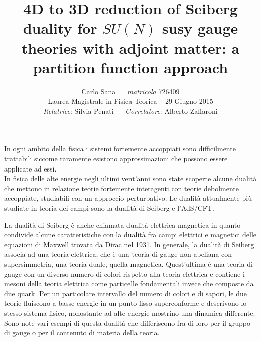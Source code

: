 \documentclass[a4paper,12pt]{article}
\author{
 Carlo Sana  ~~ \emph{matricola} 726409 \\
 Laurea Magistrale in Fisica Teorica -- 29 Giugno 2015\\
\emph{Relatrice}: Silvia Penati 
~~
\emph{Correlatore}: Alberto Zaffaroni\\
}
\date{}
\title{ \textbf{4D to 3D reduction of Seiberg duality for $SU(N)$ susy gauge theories with adjoint matter: a partition function approach }}
\begin{document}
\maketitle
In ogni ambito della fisica i sistemi fortemente accoppiati sono difficilmente trattabili siccome raramente esistono approssimazioni che possono essere applicate ad essi.\\
In fisica delle alte energie negli ultimi vent'anni sono state scoperte alcune dualità che mettono in relazione teorie fortemente interagenti con teorie debolmente accoppiate, studiabili con un approccio perturbativo.
Le dualità attualmente più studiate in teoria dei campi sono la dualità di Seiberg e l'AdS/CFT.

La dualità di Seiberg è anche chiamata dualità elettrica-magnetica in quanto condivide alcune caratteristiche con la dualità fra campi elettrici e magnetici delle equazioni di Maxwell trovata da Dirac nel 1931. 
In generale, la dualità di Seiberg associa ad una teoria elettrica, che è una teoria di gauge non abeliana con supersimmetria, una teoria duale, quella magnetica.
Quest'ultima è una teoria di gauge con un diverso numero di colori rispetto alla teoria elettrica e contiene i mesoni della teoria elettrica come particelle fondamentali invece che composte da due quark.
Per un particolare intervallo del numero di colori e di sapori, le due teorie fluiscono a basse energie in un punto fisso superconforme e descrivono lo stesso sistema fisico, nonostante ad alte energie mostrino una dinamica differente.
Sono note vari esempi di questa dualità che differiscono fra di loro per il gruppo di gauge o per il contenuto di materia della teoria.
\end{document}
